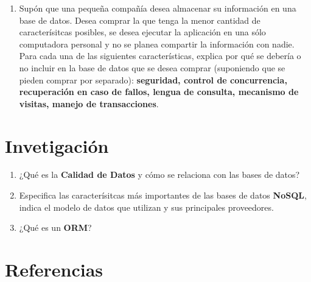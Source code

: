 \documentclass{article}
\begin{document}
\begin{enumerate}[label=\alph*.]
{        }
        \item {
            Supón que una pequeña compañía desea almacenar su información en una
            base de datos. Desea comprar la que tenga la menor cantidad de 
            caracterísitcas posibles, se desea ejecutar la aplicación en una 
            sólo computadora personal y no se planea compartir la información con
            nadie. Para cada una de las siguientes características, explica por
            qué se debería o no incluir en la base de datos que se desea comprar
            (suponiendo que se pieden comprar por separado): \textbf{seguridad, 
            control de concurrencia, recuperación en caso de fallos, lengua de 
            consulta, mecanismo de visitas, manejo de transacciones}.
        }
    \end{enumerate}

    \section{Invetigación}
    \begin{enumerate}[label=\alph*.]
        \item {
            ¿Qué es la \textbf{Calidad de Datos} y cómo se relaciona con las 
            bases de datos?
        }
        \item {
            Especifica las caracterísitcas más importantes de las bases de datos
            \textbf{NoSQL}, indica el modelo de datos que utilizan y sus 
            principales proveedores.
        }
        \item {
            ¿Qué es un \textbf{ORM}?
        }
    \end{enumerate}

    \section{Referencias}
\end{document}

